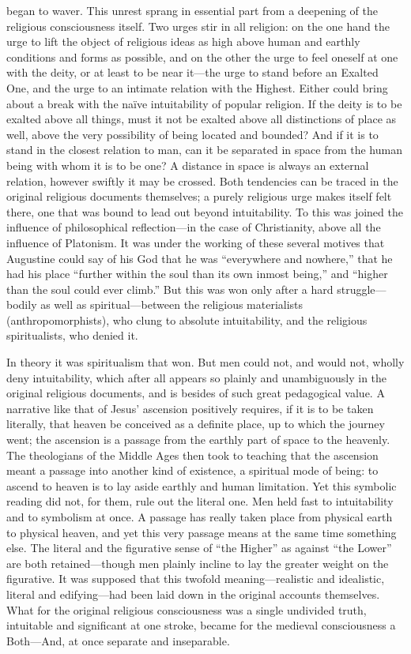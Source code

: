 \documentclass[12pt,a4paper]{article}
\newcommand{\opage}[1]{\marginnote{\footnotesize\textit{[#1]}}}
\begin{document}
began to waver. This unrest sprang in essential part from a deepening of the
religious consciousness itself. Two urges stir in all religion: on the one hand
the urge to lift the object of religious ideas as high above human and earthly
conditions and forms as possible, and on the other the urge to feel oneself at
one with the deity, or at least to be near it---the urge to stand before an
Exalted One, and the urge to an intimate relation with the Highest. Either could
bring about a break with the naïve intuitability of popular religion. If the
deity is to be exalted above all things, must it not be exalted above all
distinctions of place as well, above the very possibility of being located and
bounded? And if it is to stand in the closest relation to man, can it be
separated in space from the human being with whom it is to be one? A distance in
space is always an external relation, however swiftly it may be crossed. Both
tendencies can be traced in the original \opage{6}religious documents themselves; a purely
religious urge makes itself felt there, one that was bound to lead out beyond
intuitability. To this was joined the influence of philosophical reflection---in
the case of Christianity, above all the influence of Platonism. It was under the
working of these several motives that Augustine could say of his God that he was
``everywhere and nowhere,'' that he had his place ``further within the soul than
its own inmost being,'' and ``higher than the soul could ever climb.'' But this
was won only after a hard struggle---bodily as well as spiritual---between the
religious materialists (anthropomorphists), who clung to absolute intuitability,
and the religious spiritualists, who denied it.

In theory it was spiritualism that won. But men could not, and would not, wholly
deny intuitability, which after all appears so plainly and unambiguously in the
original religious documents, and is besides of such great pedagogical value. A
narrative like that of Jesus' ascension positively requires, if it is to be taken
literally, that heaven be conceived as a definite place, up to which the journey
went; the ascension is a passage from the earthly part of space to the heavenly.
The theologians of the Middle Ages then took to teaching that the ascension meant
a passage into another kind of existence, a spiritual mode of being: to ascend to
heaven is to lay aside earthly and human limitation. Yet this symbolic reading
did not, for them, rule out the literal one. Men held fast to intuitability and
to symbolism at once. A passage has really taken place from physical earth to
physical heaven, and yet this very passage means at the same time something else.
The literal and the figurative sense of ``the Higher'' as against ``the Lower''
are both retained---though men plainly incline to lay the greater weight on the
\opage{7}figurative. It was supposed that this twofold meaning---realistic and idealistic,
literal and edifying---had been laid down in the original accounts themselves.
What for the original religious consciousness was a single undivided truth,
intuitable and significant at one stroke, became for the medieval consciousness a
Both---And, at once separate and inseparable.
\end{document}
